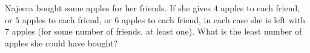 Najeera bought some apples for her friends. If she gives $4$ apples to each friend, or $5$ apples to each friend, or $6$ apples to each friend, in each case she is left with $7$ apples (for some number of friends, at least one). What is the least number of apples she could have bought?

